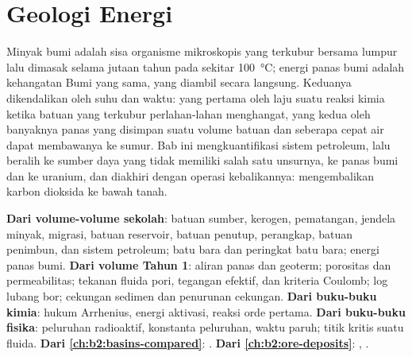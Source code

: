 \chapter{Geologi Energi}\label{ch:b2:energy-geology}

Minyak bumi adalah sisa organisme mikroskopis yang terkubur bersama lumpur lalu dimasak selama jutaan tahun pada
sekitar \qty{100}{\celsius}; energi panas bumi adalah kehangatan Bumi yang sama, yang diambil secara langsung.
Keduanya dikendalikan oleh suhu dan waktu: yang pertama oleh laju suatu reaksi kimia ketika
batuan yang terkubur perlahan-lahan menghangat, yang kedua oleh banyaknya panas yang disimpan suatu volume batuan dan seberapa cepat air
dapat membawanya ke sumur. Bab ini mengkuantifikasi sistem petroleum, lalu beralih ke sumber daya yang
tidak memiliki salah satu unsurnya, ke panas bumi dan ke uranium, dan diakhiri dengan operasi kebalikannya:
mengembalikan karbon dioksida ke bawah tanah.

\begin{recall}
\textbf{Dari volume-volume sekolah}: batuan sumber, kerogen, pematangan, jendela minyak, migrasi,
batuan reservoir, batuan penutup, perangkap, batuan penimbun, dan sistem petroleum; batu bara dan peringkat batu bara; energi panas bumi.
\textbf{Dari volume Tahun 1}: aliran panas dan geoterm; porositas dan permeabilitas; tekanan fluida
pori, tegangan efektif, dan kriteria Coulomb; log lubang bor; cekungan sedimen dan
penurunan cekungan. \textbf{Dari buku-buku kimia}: hukum Arrhenius, energi aktivasi, reaksi
orde pertama. \textbf{Dari buku-buku fisika}: peluruhan radioaktif, konstanta peluruhan, waktu paruh; titik
kritis suatu fluida. \textbf{Dari \cref{ch:b2:basins-compared}}: .
\textbf{Dari \cref{ch:b2:ore-deposits}}: , .
\end{recall}

